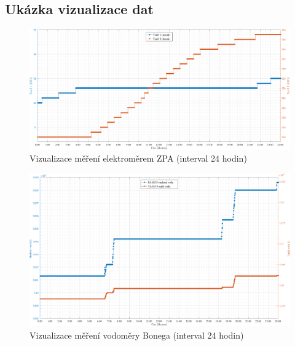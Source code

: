 \begin{landscape}
\chapter{Ukázka vizualizace dat}
\label{PrilohaGrafy}
	 \begin{figure}[!ht]
  \begin{center}
    \includegraphics[scale=0.7]{graphs/VygenerujGrafZpa}
  \end{center}
	\vspace{-20pt}
  \caption{Vizualizace měření elektroměrem ZPA (interval 24 hodin)}
	\label{GrafPriloha3}
\end{figure}
	\begin{figure}[!ht]
  \begin{center}
    \includegraphics[scale=0.7]{graphs/VygenerujGrafBonega}
  \end{center}
	\vspace{-20pt}
  \caption{Vizualizace měření vodoměry Bonega (interval 24 hodin)}
	\label{GrafPriloha2}
\end{figure}
	 \begin{figure}[!ht]

\end{figure}
\end{landscape}
